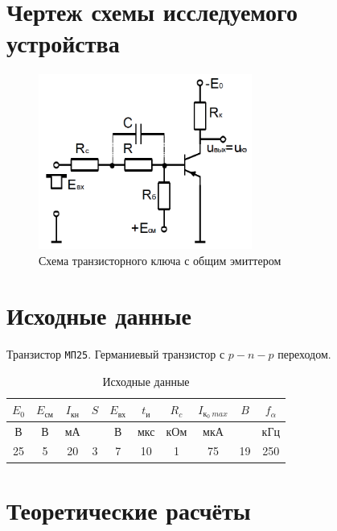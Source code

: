 \documentclass[a4paper,14pt]{extarticle}
\begin{document}
\section{Чертеж схемы исследуемого устройства}

\begin{figure}[H]
\begin{center}
	\vspace{-0.5cm}
	\includegraphics[width=7cm]{scheme}
	\caption{Схема транзисторного ключа с общим эмиттером}
	\vspace{-0.5cm}
\end{center}
\end{figure}

\section{Исходные данные}

Транзистор \verb+МП25+. Германиевый транзистор с $p-n-p$ переходом.

\begin{table}[H]
\begin{center}
	\caption{Исходные данные}
	\def\tabcolsep{12pt}
	\begin{tabular}{|c|c|c|c|c|c|c|c|c|c|}
		\hline
		$E_0$ &
		$E_\text{см}$ &
		$I_\text{кн}$ &
		$S$ &
		$E_\text{вх}$ &
		$t_\text{и}$ &
		$R_c$ &
		$I_{\text{к}_0\ max}$ &
		$B$ &
		$f_\alpha$ \\
		\hline
		В &
		В &
		мА &
		 &
		В &
		мкс &
		кОм &
		мкА &
		 &
		кГц \\
		\hline
		25 &
		5 &
		20 &
		3 &
		7 &
		10 &
		1 &
		75 &
		19 &
		250 \\
	    \hline	
	\end{tabular}
\end{center}
\end{table}

\section{Теоретические расчёты}
\end{document}
